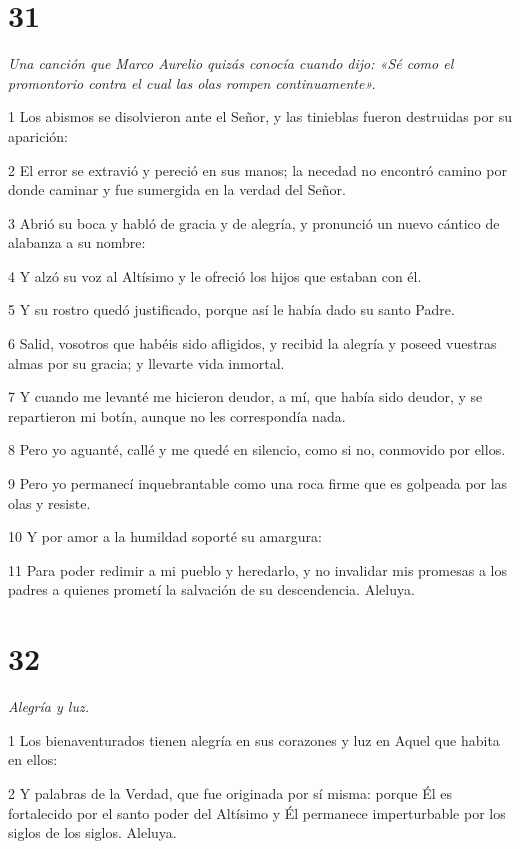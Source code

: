 \chapter{31}

\par \textit{Una canción que Marco Aurelio quizás conocía cuando dijo: «Sé como el promontorio contra el cual las olas rompen continuamente».}

\par 1 Los abismos se disolvieron ante el Señor, y las tinieblas fueron destruidas por su aparición:
\par 2 El error se extravió y pereció en sus manos; la necedad no encontró camino por donde caminar y fue sumergida en la verdad del Señor.
\par 3 Abrió su boca y habló de gracia y de alegría, y pronunció un nuevo cántico de alabanza a su nombre:
\par 4 Y alzó su voz al Altísimo y le ofreció los hijos que estaban con él.
\par 5 Y su rostro quedó justificado, porque así le había dado su santo Padre.
\par 6 Salid, vosotros que habéis sido afligidos, y recibid la alegría y poseed vuestras almas por su gracia; y llevarte vida inmortal.
\par 7 Y cuando me levanté me hicieron deudor, a mí, que había sido deudor, y se repartieron mi botín, aunque no les correspondía nada.
\par 8 Pero yo aguanté, callé y me quedé en silencio, como si no, conmovido por ellos.
\par 9 Pero yo permanecí inquebrantable como una roca firme que es golpeada por las olas y resiste.
\par 10 Y por amor a la humildad soporté su amargura:
\par 11 Para poder redimir a mi pueblo y heredarlo, y no invalidar mis promesas a los padres a quienes prometí la salvación de su descendencia. Aleluya.

\chapter{32}

\par \textit{Alegría y luz.}

\par 1 Los bienaventurados tienen alegría en sus corazones y luz en Aquel que habita en ellos:
\par 2 Y palabras de la Verdad, que fue originada por sí misma: porque Él es fortalecido por el santo poder del Altísimo y Él permanece imperturbable por los siglos de los siglos. Aleluya.

